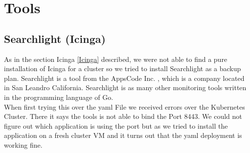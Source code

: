 
\chapter{Tools} %
\section{Searchlight (Icinga)}
\label{searchlight}
As in the section Icinga \ref{Icinga} described, we were not able to find a pure installation of Icinga for a cluster so we tried to install Searchlight as a backup plan.
Searchlight is a tool from the AppsCode Inc. \cite{appscode}, which is a company located in San Leandro California. 
Searchlight is as many other monitoring tools written in the programming language of Go.
\\
When first trying this over the yaml File we received errors over the Kubernetes Cluster. There it says the tools is not able to bind the Port 8443. We could not figure out which application is using the port but as we tried to install the application on a fresh cluster VM and it turns out that the yaml deployment is working fine.
